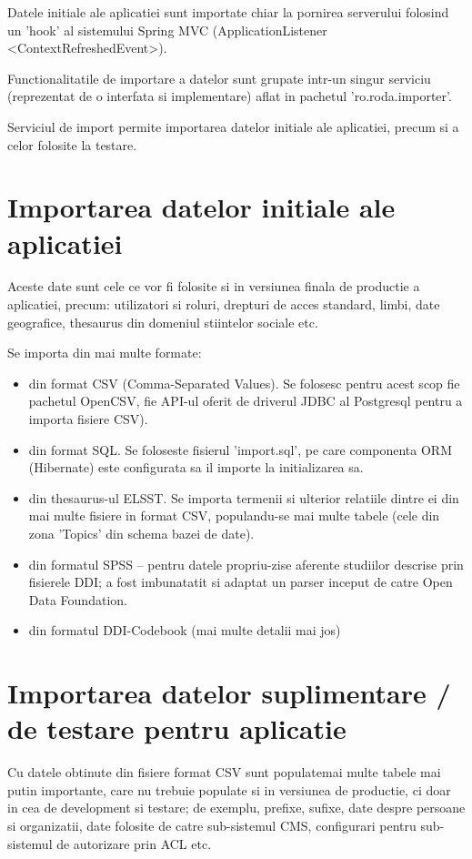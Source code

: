 Datele initiale ale aplicatiei sunt importate chiar la pornirea serverului folosind un 'hook' al sistemului Spring MVC (ApplicationListener <ContextRefreshedEvent>).

Functionalitatile de importare a datelor sunt grupate intr-un singur serviciu (reprezentat de o interfata si implementare) aflat in pachetul 'ro.roda.importer'.

Serviciul de import permite importarea datelor initiale ale aplicatiei, precum si a celor folosite la testare.

\section{Importarea datelor initiale ale aplicatiei}

Aceste date sunt cele ce vor fi folosite si in versiunea finala de productie a aplicatiei, precum: 
utilizatori si roluri, drepturi de acces standard, limbi, date geografice, thesaurus din domeniul stiintelor sociale etc.

Se importa din mai multe formate:
\begin{itemize}
\item din format CSV (Comma-Separated Values). Se folosesc pentru acest scop fie pachetul OpenCSV, fie API-ul oferit de driverul JDBC al Postgresql pentru a importa fisiere CSV).
\item din format SQL. Se foloseste fisierul 'import.sql', pe care componenta ORM (Hibernate) este configurata sa il importe la initializarea sa.
\item din thesaurus-ul ELSST. Se importa termenii si ulterior relatiile dintre ei din mai multe fisiere in format CSV, 
populandu-se mai multe tabele (cele din zona 'Topics' din schema bazei de date).
\item din formatul SPSS -- pentru datele propriu-zise aferente studiilor descrise prin fisierele DDI; a fost imbunatatit si adaptat un parser inceput de catre Open Data Foundation.
\item din formatul DDI-Codebook (mai multe detalii mai jos)
\end{itemize}

\section{Importarea datelor suplimentare / de testare pentru aplicatie}

Cu datele obtinute din fisiere format CSV sunt populatemai multe tabele mai putin importante, care nu trebuie populate si in versiunea de productie, ci doar in cea de development si testare;
de exemplu, prefixe, sufixe, date despre persoane si organizatii, date folosite de catre sub-sistemul CMS, configurari pentru sub-sistemul de autorizare prin ACL etc.


